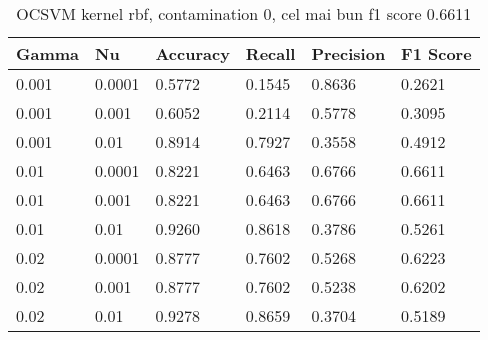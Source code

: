 \begin{table}[H]
    \caption{OCSVM kernel rbf, contamination 0, cel mai bun f1 score 0.6611}
    \centering
    \begin{tabularx}{\textwidth}{
        |X
        |X
        |X
        |X
        |X
        |X|
    }
    \hline
    {Gamma} & {Nu} & {Accuracy} & {Recall} & {Precision} & {F1 Score} \\
    \hline
    0.001 & 0.0001 & 0.5772 & 0.1545 & 0.8636 & 0.2621 \\
    0.001 & 0.001 & 0.6052 & 0.2114 & 0.5778 & 0.3095 \\
    0.001 & 0.01 & 0.8914 & 0.7927 & 0.3558 & 0.4912 \\
    0.01 & 0.0001 & 0.8221 & 0.6463 & 0.6766 & 0.6611 \\
    0.01 & 0.001 & 0.8221 & 0.6463 & 0.6766 & 0.6611 \\
    0.01 & 0.01 & 0.9260 & 0.8618 & 0.3786 & 0.5261 \\
    0.02 & 0.0001 & 0.8777 & 0.7602 & 0.5268 & 0.6223 \\
    0.02 & 0.001 & 0.8777 & 0.7602 & 0.5238 & 0.6202 \\
    0.02 & 0.01 & 0.9278 & 0.8659 & 0.3704 & 0.5189 \\
    \hline
    \end{tabularx}
\end{table}


